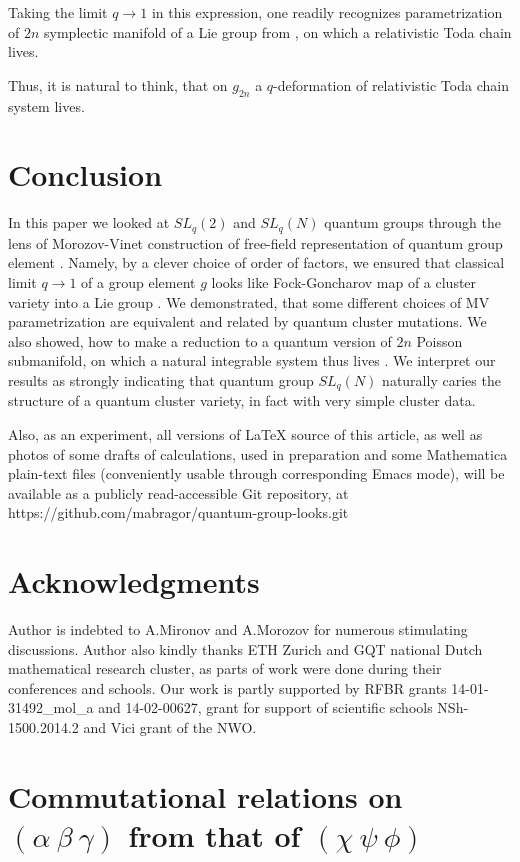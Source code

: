 \documentclass{article}
\newcommand {\?}{\textit{???}}
\def\classlim{q \rightarrow 1}
\begin{document}
Taking the limit $\classlim$ in this expression, one readily recognizes
parametrization of $2n$ symplectic manifold of a Lie group from \cite{Mars1},
on which a relativistic Toda chain lives.


Thus, it is natural to think, that on $g_{2n}$ a $q$-deformation of relativistic Toda chain
system lives.

\section{Conclusion}
In this paper we looked at $SL_q(2)$ and $SL_q(N)$ quantum groups through
the lens of Morozov-Vinet construction of free-field representation of
quantum group element \cite{MV1}. Namely, by a clever choice of order of factors, we
ensured that classical limit $\classlim$ of a group element $g$ looks like
Fock-Goncharov map of a cluster variety into a Lie group \cite{FG2}.
We demonstrated, that some different choices of MV parametrization are equivalent
and related by quantum cluster mutations.
We also showed, how to make a reduction to a quantum version of $2n$ Poisson submanifold,
on which a natural integrable system thus lives \cite{Mars1}.
We interpret our results as strongly indicating that quantum group $SL_q(N)$ naturally
caries the structure of a quantum cluster variety, in fact with very simple cluster data.

Also, as an experiment, all versions of LaTeX source of this article, as well as
photos of some drafts of calculations, used in preparation
and some Mathematica plain-text files (conveniently usable through corresponding Emacs mode), will be available as
a publicly read-accessible Git repository, at
\\ https://github.com/mabragor/quantum-group-looks.git


\section*{Acknowledgments}

Author is indebted to A.Mironov and A.Morozov for numerous stimulating discussions.
Author also kindly thanks ETH Zurich and GQT national Dutch mathematical research cluster,
as parts of work were done during their conferences and schools.
Our work is partly supported by RFBR grants 14-01-31492\_mol\_a and 14-02-00627,
 grant for support of scientific schools NSh-1500.2014.2 and Vici grant of the NWO.

\appendix

\section{Commutational relations on $(\alpha\ \beta\ \gamma)$ from that of $(\chi\ \psi\ \phi)$}
\label{sec:alpha-beta-gamma-from-chi-psi-phi}
\end{document}
